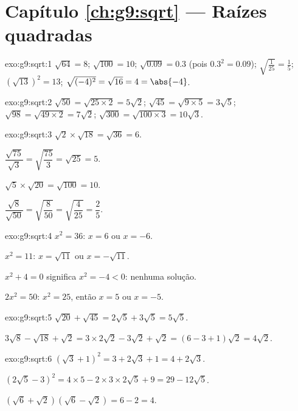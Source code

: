 \section*{Capítulo \ref{ch:g9:sqrt} --- Raízes quadradas}

\begin{solution}{exo:g9:sqrt:1}
$\sqrt{64} = 8$; \quad $\sqrt{100} = 10$; \quad
$\sqrt{0.09} = 0.3$ (pois $0.3^2 = 0.09$); \quad
$\sqrt{\frac{1}{25}} = \frac15$; \quad
$\left(\sqrt{13}\right)^2 = 13$; \quad
$\sqrt{(-4)^2} = \sqrt{16} = 4 = \abs{-4}$.
\end{solution}

\begin{solution}{exo:g9:sqrt:2}
$\sqrt{50} = \sqrt{25 \times 2} = 5\sqrt2$; \quad
$\sqrt{45} = \sqrt{9 \times 5} = 3\sqrt5$; \quad
$\sqrt{98} = \sqrt{49 \times 2} = 7\sqrt2$; \quad
$\sqrt{300} = \sqrt{100 \times 3} = 10\sqrt3$.
\end{solution}

\begin{solution}{exo:g9:sqrt:3}
$\sqrt2 \times \sqrt{18} = \sqrt{36} = 6$.

$\dfrac{\sqrt{75}}{\sqrt3} = \sqrt{\dfrac{75}{3}} = \sqrt{25} = 5$.

$\sqrt5 \times \sqrt{20} = \sqrt{100} = 10$.

$\dfrac{\sqrt8}{\sqrt{50}} = \sqrt{\dfrac{8}{50}} =
\sqrt{\dfrac{4}{25}} = \dfrac25$.
\end{solution}

\begin{solution}{exo:g9:sqrt:4}
$x^2 = 36$: $x = 6$ ou $x = -6$.

$x^2 = 11$: $x = \sqrt{11}$ ou $x = -\sqrt{11}$.

$x^2 + 4 = 0$ significa $x^2 = -4 < 0$: nenhuma solução.

$2x^2 = 50$: $x^2 = 25$, então $x = 5$ ou $x = -5$.
\end{solution}

\begin{solution}{exo:g9:sqrt:5}
$\sqrt{20} + \sqrt{45} = 2\sqrt5 + 3\sqrt5 = 5\sqrt5$.

$3\sqrt8 - \sqrt{18} + \sqrt2 = 3 \times 2\sqrt2 - 3\sqrt2 + \sqrt2
= (6 - 3 + 1)\sqrt2 = 4\sqrt2$.
\end{solution}

\begin{solution}{exo:g9:sqrt:6}
$\left(\sqrt3 + 1\right)^2 = 3 + 2\sqrt3 + 1 = 4 + 2\sqrt3$.

$\left(2\sqrt5 - 3\right)^2 = 4 \times 5 - 2 \times 3 \times 2\sqrt5
+ 9 = 29 - 12\sqrt5$.

$\left(\sqrt6 + \sqrt2\right)\left(\sqrt6 - \sqrt2\right) = 6 - 2 = 4$.
\end{solution}

